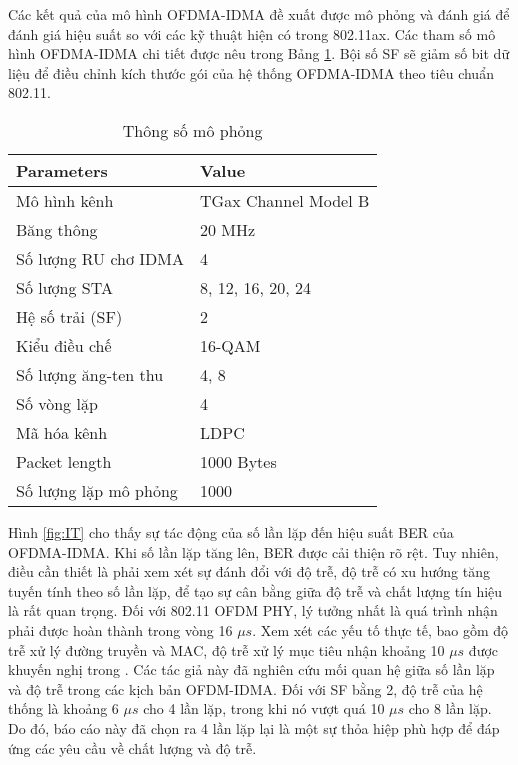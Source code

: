 Các kết quả của mô hình OFDMA-IDMA đề xuất được mô phỏng và đánh giá để đánh giá hiệu suất so với các kỹ thuật hiện có trong 802.11ax. Các tham số mô hình OFDMA-IDMA chi tiết được nêu trong Bảng \ref{tab:Para}. Bội số SF sẽ giảm số bit dữ liệu để điều chỉnh kích thước gói của hệ thống OFDMA-IDMA theo tiêu chuẩn 802.11.

\begin{table}[H]
    \normalsize
    \centering
    \caption{Thông số mô phỏng}
    \label{tab:Para}
    \begin{tabular}{|l|l|}
    \hline
    \textbf{Parameters}         & \textbf{Value}    \\ \hline
    Mô hình kênh                & TGax Channel Model B    \\ \hline
    Băng thông                  & 20 MHz            \\ \hline
    Số lượng RU chơ IDMA        & 4                 \\ \hline
    Số lượng STA                & 8, 12, 16, 20, 24 \\ \hline
    Hệ số trải (SF)             & 2                 \\ \hline
    Kiểu điều chế               & 16-QAM            \\ \hline
    Số lượng ăng-ten thu        & 4, 8              \\ \hline
    Số vòng lặp                 & 4                 \\ \hline
    Mã hóa kênh                 & LDPC              \\ \hline
    Packet length               & 1000 Bytes        \\ \hline
    Số lượng lặp mô phỏng       & 1000              \\ \hline
    \end{tabular}
\end{table}
Hình \ref{fig:IT} cho thấy sự tác động của số lần lặp đến hiệu suất BER của OFDMA-IDMA. Khi số lần lặp tăng lên, BER được cải thiện rõ rệt. Tuy nhiên, điều cần thiết là phải xem xét sự đánh đổi với độ trễ, độ trễ có xu hướng tăng tuyến tính theo số lần lặp, để tạo sự cân bằng giữa độ trễ và chất lượng tín hiệu là rất quan trọng.
Đối với 802.11 \acrshort{OFDM} PHY, lý tưởng nhất là quá trình nhận phải được hoàn thành trong vòng 16 $\mu s$. Xem xét các yếu tố thực tế, bao gồm độ trễ xử lý đường truyền và \acrshort{MAC}, độ trễ xử lý mục tiêu nhận khoảng 10 $\mu s$ được khuyến nghị trong \cite{UL-OFDM-IDMA}.
Các tác giả này đã nghiên cứu mối quan hệ giữa số lần lặp và độ trễ trong các kịch bản OFDM-IDMA. Đối với SF bằng 2, độ trễ của hệ thống là khoảng 6 $\mu s$ cho 4 lần lặp, trong khi nó vượt quá 10 $\mu s$ cho 8 lần lặp. Do đó, báo cáo này đã chọn ra 4 lần lặp lại là một sự thỏa hiệp phù hợp để đáp ứng các yêu cầu về chất lượng và độ trễ.

